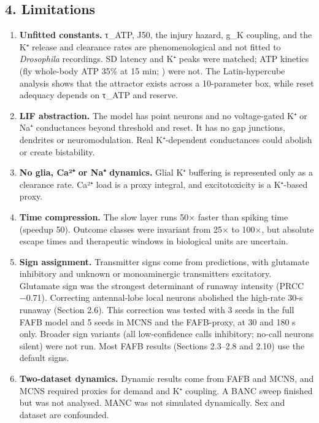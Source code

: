\documentclass[11pt]{article}
\providecommand{\tightlist}{\setlength{\itemsep}{0pt}\setlength{\parskip}{0pt}}
\begin{document}
\subsection{4. Limitations}\label{limitations}

\begin{enumerate}
\def\labelenumi{\arabic{enumi}.}
\tightlist
\item
  \textbf{Unfitted constants.} τ\_ATP, J50, the injury hazard, g\_K coupling, and the K⁺ release and clearance rates are phenomenological and not fitted to \emph{Drosophila} recordings. SD latency and K⁺ peaks were matched; ATP kinetics (fly whole-body ATP 35\% at 15 min; \cite{campbell2018}) were not. The Latin-hypercube analysis shows that the attractor exists across a 10-parameter box, while reset adequacy depends on τ\_ATP and reserve.
\item
  \textbf{LIF abstraction.} The model has point neurons and no voltage-gated K⁺ or Na⁺ conductances beyond threshold and reset. It has no gap junctions, dendrites or neuromodulation. Real K⁺-dependent conductances could abolish or create bistability.
\item
  \textbf{No glia, Ca²⁺ or Na⁺ dynamics.} Glial K⁺ buffering \cite{andersen2026,armstrong2011} is represented only as a clearance rate. Ca²⁺ load is a proxy integral, and excitotoxicity is a K⁺-based proxy.
\item
  \textbf{Time compression.} The slow layer runs 50× faster than spiking time (speedup 50). Outcome classes were invariant from 25× to 100×, but absolute escape times and therapeutic windows in biological units are uncertain.
\item
  \textbf{Sign assignment.} Transmitter signs come from predictions, with glutamate inhibitory and unknown or monoaminergic transmitters excitatory. Glutamate sign was the strongest determinant of runaway intensity (PRCC −0.71). Correcting antennal-lobe local neurons abolished the high-rate 30-s runaway (Section 2.6). This correction was tested with 3 seeds in the full FAFB model and 5 seeds in MCNS and the FAFB-proxy, at 30 and 180 s only. Broader sign variants (all low-confidence calls inhibitory; no-call neurons silent) were not run. Most FAFB results (Sections 2.3--2.8 and 2.10) use the default signs.
\item
  \textbf{Two-dataset dynamics.} Dynamic results come from FAFB and MCNS, and MCNS required proxies for demand and K⁺ coupling. A BANC sweep finished but was not analysed. MANC was not simulated dynamically. Sex and dataset are confounded.

\end{enumerate}
\end{document}
